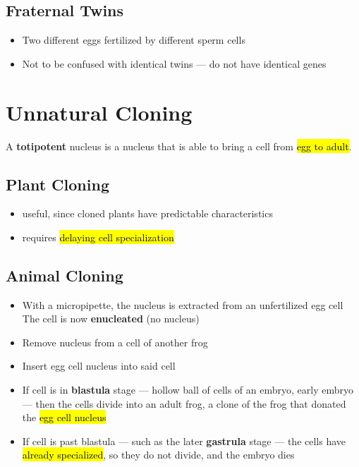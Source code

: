 \documentclass[a4paper,12pt]{article}
\begin{document}
\subsection{Fraternal Twins}
\begin{itemize}
    \item{Two different eggs fertilized by different sperm cells}
    \item{Not to be confused with identical twins --- do not have identical genes}
\end{itemize}

\pagebreak

\section{Unnatural Cloning}

A \textbf{totipotent} nucleus is a nucleus that is able to bring a cell from \hl{egg to adult}.

\subsection{Plant Cloning}
\begin{itemize}
    \item{useful, since cloned plants have predictable characteristics}
    \item{requires \hl{delaying cell specialization}}
\end{itemize}

\subsection{Animal Cloning}
\begin{itemize}
    \item{With a micropipette, the nucleus is extracted from an unfertilized egg cell\\The cell is now \textbf{enucleated} (no nucleus)}
    \item{Remove nucleus from a cell of another frog}
    \item{Insert egg cell nucleus into said cell}
    \item{If cell is in \textbf{blastula} stage --- hollow ball of cells of an embryo, early embryo --- then the cells divide into an adult frog, a clone of the frog that donated the \hl{egg cell nucleus}}
    \item{If cell is past blastula --- such as the later \textbf{gastrula} stage --- the cells have \hl{already specialized}, so they do not divide, and the embryo dies}
\end{itemize}
\end{document}

